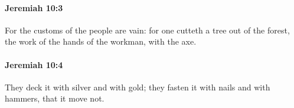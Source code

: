 		\paragraph{Jeremiah 10:3} %
			\label{JEREMIAH-10-3}

			For the customs of the people are vain: for one cutteth a tree out of the forest, the work of the hands of the workman, with the axe.


		\paragraph{Jeremiah 10:4} %
			\label{JEREMIAH-10-4}

			They deck it with silver and with gold; they fasten it with nails and with hammers, that it move not.


